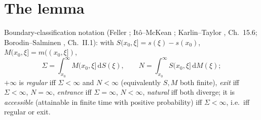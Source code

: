 \documentclass[11pt]{article}
\theoremstyle{remark}
\newcommand{\dd}{\mathrm{d}}
\begin{document}
\section*{The lemma}

Boundary-classification notation (Feller \cite{Feller1952,Feller1957};
It\^o--McKean \cite{ItoMcKean}; Karlin--Taylor \cite{KarlinTaylor},
Ch.~15.6; Borodin--Salminen \cite{BorodinSalminen}, Ch.~II.1):
with $S(x_{0},\xi]=s(\xi)-s(x_{0})$, $M(x_{0},\xi]=m((x_{0},\xi])$,
\[
\Sigma=\int^{\infty}_{x_{0}} M(x_{0},\xi]\,\dd S(\xi),
\qquad
N=\int^{\infty}_{x_{0}} S(x_{0},\xi]\,\dd M(\xi);
\]
$+\infty$ is \emph{regular} iff $\Sigma<\infty$ and $N<\infty$
(equivalently $S,M$ both finite), \emph{exit} iff $\Sigma<\infty$,
$N=\infty$, \emph{entrance} iff $\Sigma=\infty$, $N<\infty$,
\emph{natural} iff both diverge; it is \emph{accessible} (attainable in
finite time with positive probability) iff $\Sigma<\infty$, i.e.\ iff
regular or exit.
\end{document}
